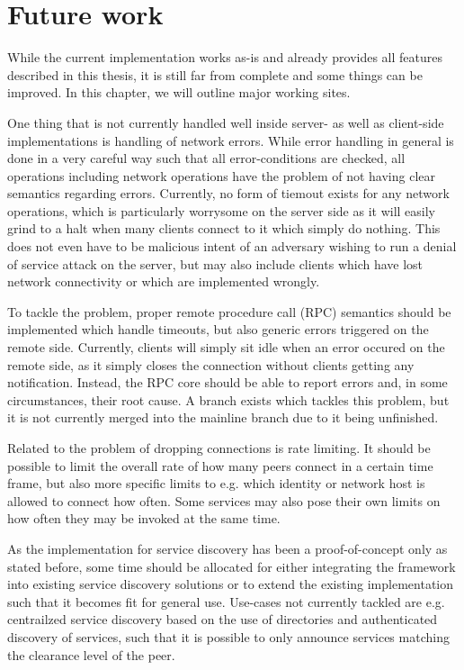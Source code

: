 \section{Future work}

While the current implementation works as-is and already provides all features described in this thesis, it is still far from complete and some things can be improved.
In this chapter, we will outline major working sites.

One thing that is not currently handled well inside server- as well as client-side implementations is handling of network errors.
While error handling in general is done in a very careful way such that all error-conditions are checked, all operations including network operations have the problem of not having clear semantics regarding errors.
Currently, no form of tiemout exists for any network operations, which is particularly worrysome on the server side as it will easily grind to a halt when many clients connect to it which simply do nothing.
This does not even have to be malicious intent of an adversary wishing to run a denial of service attack on the server, but may also include clients which have lost network connectivity or which are implemented wrongly.

To tackle the problem, proper remote procedure call (RPC) semantics should be implemented which handle timeouts, but also generic errors triggered on the remote side.
Currently, clients will simply sit idle when an error occured on the remote side, as it simply closes the connection without clients getting any notification.
Instead, the RPC core should be able to report errors and, in some circumstances, their root cause.
A branch exists which tackles this problem, but it is not currently merged into the mainline branch due to it being unfinished.

Related to the problem of dropping connections is rate limiting.
It should be possible to limit the overall rate of how many peers connect in a certain time frame, but also more specific limits to e.g. which identity or network host is allowed to connect how often.
Some services may also pose their own limits on how often they may be invoked at the same time.

As the implementation for service discovery has been a proof-of-concept only as stated before, some time should be allocated for either integrating the framework into existing service discovery solutions or to extend the existing implementation such that it becomes fit for general use.
Use-cases not currently tackled are e.g. centrailzed service discovery based on the use of directories and authenticated discovery of services, such that it is possible to only announce services matching the clearance level of the peer.

